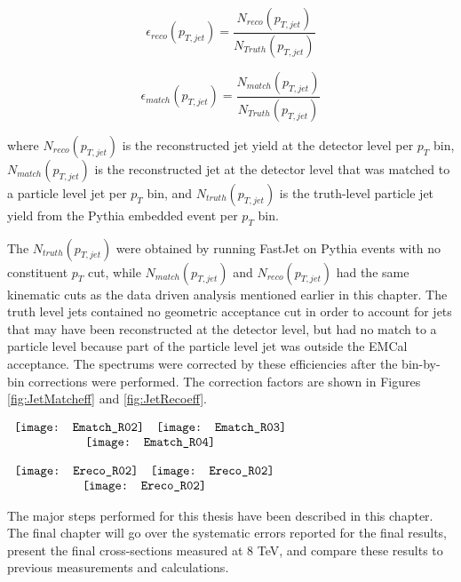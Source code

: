 \begin{equation}
 \epsilon_{reco} (p_{T, jet}) = \frac{N_{reco}(p_{T, jet}) }{N_{Truth} (p_{T, jet})}
\label{eq:jetrecoeff}
\end{equation}

\begin{equation}
 \epsilon_{match} (p_{T, jet}) = \frac{N_{match}(p_{T, jet}) }{N_{Truth}(p_{T, jet})}
\label{eq:jetmatchoeff}
\end{equation}

\noindent 
where $N_{reco} (p_{T, jet})$ is the reconstructed jet yield at the detector level per $p_{T}$ bin, $N_{match}(p_{T, jet})$ is the reconstructed jet at the detector level that was matched to a particle level jet per $p_{T}$ bin, and $N_{truth} (p_{T, jet})$ is the truth-level particle jet yield from the Pythia embedded event per $p_{T}$ bin.  

The $N_{truth} (p_{T, jet})$ were obtained by running FastJet on Pythia events with no constituent $p_{T}$ cut, while $N_{match}(p_{T, jet})$ and $N_{reco} (p_{T, jet})$ had the same kinematic cuts as the data driven analysis mentioned earlier in this chapter.  The truth level jets contained no geometric acceptance cut in order to account for jets that may have been reconstructed at the detector level, but had no match to a particle level because part of the particle level jet was outside the EMCal acceptance.  The spectrums were corrected by these efficiencies after the bin-by-bin corrections were performed.  The correction factors are shown in Figures \ref{fig:JetMatcheff} and \ref{fig:JetRecoeff}.

\begin{figure*}[t!]
$\begin{array}{rl}
    \texttt{[image: Ematch\_R02]} &
    \texttt{[image: Ematch\_R03]}\\
    \multicolumn{2}{c}{\texttt{[image: Ematch\_R04]}}
\end{array}$
\caption[Jet reconstruction efficiency for jets between R = 0.2 and R = 0.4. ]{\label{fig:JetMatcheff}Jet matching efficiency for jets between R = 0.2 and R = 0.4.}
\end{figure*}

\begin{figure*}[t!]
$\begin{array}{rl}
    \texttt{[image: Ereco\_R02]} &
    \texttt{[image: Ereco\_R02]}\\
    \multicolumn{2}{c}{\texttt{[image: Ereco\_R02]}}
\end{array}$
\caption[Jet reconstruction efficiency for jets between R = 0.2 and R = 0.4.]{\label{fig:JetRecoeff}Jet reconstruction efficiency for jets between R = 0.2 and R = 0.4}
\end{figure*}


The major steps performed for this thesis have been described in this chapter.  The final chapter will go over the systematic errors reported for the final results, present the final cross-sections measured at 8 TeV, and compare these results to previous measurements and  calculations.

